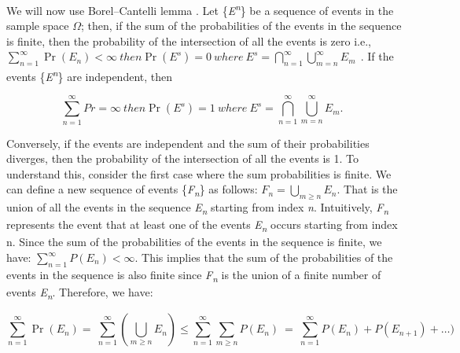 \documentclass[12pt,a4paper]{report}
\numberwithin{equation}{section}
\begin{document}
We will now use Borel--Cantelli lemma \cite{stein2005real_87}. Let
\{\emph{E\textsuperscript{n}}\} be a sequence of events in the sample
space \emph{$\Omega$}; then, if the sum of the probabilities of the events in
the sequence is finite, then the probability of the intersection of all
the events is zero i.e.,
\(\sum_{n = 1}^{\infty}{\Pr\left( E_{n} \right) < \infty\ then\Pr\left( E^{s} \right) = 0\ where\ E^{s} = \bigcap_{n = 1}^{\infty}{\bigcup_{m = n}^{\infty}E_{m}}\ \ }\).
If the events \{\emph{E\textsuperscript{n}}\} are independent, then

\[\sum_{n = 1}^{\infty}{Pr = \infty\ then\Pr\left( E^{s} \right) = 1\ where\ E^{s} = \bigcap_{n = 1}^{\infty}{\bigcup_{m = n}^{\infty}{E_{m}.}}\ \ }\]

Conversely, if the events are independent and the sum of their
probabilities diverges, then the probability of the intersection of all
the events is 1. To understand this, consider the first case where the
sum probabilities is finite. We can define a new sequence of events
\{\emph{F\textsubscript{n}}\} as follows:
\(F_{n} = \bigcup_{m \geq n}^{}E_{n}\). That is the union of all the
events in the sequence \emph{E\textsubscript{n}} starting from index
\emph{n}. Intuitively, \emph{F\textsubscript{n}} represents the event
that at least one of the events \emph{E\textsubscript{n}} occurs
starting from index n. Since the sum of the probabilities of the events
in the sequence is finite, we have:
\(\sum_{n = 1}^{\infty}{P\left( E_{n} \right) < \infty}\). This implies
that the sum of the probabilities of the events in the sequence is also
finite since \emph{F\textsubscript{n}} is the union of a finite number
of events \emph{E\textsubscript{n}}. Therefore, we have:

\[\sum_{n = 1}^{\infty}{\Pr\left( E_{n} \right) = \ \sum_{n = 1}^{\infty}{\left( \bigcup_{m \geq n}^{}E_{n} \right) \leq \sum_{n = 1}^{\infty}{\sum_{m \geq n}^{}{P(E_{n})}}}\  = \ \sum_{n = 1}^{\infty}{P\left( E_{n} \right) + P\left( E_{n + 1} \right) + \ldots)}\ }\ \]
\end{document}
